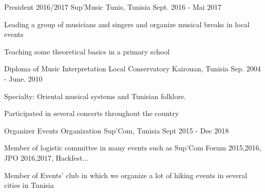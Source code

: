 

\begin{cventries}

  \cventry
    {President 2016/2017} %
    {Sup'Music} %
    {Tunis, Tunisia } %
    {Sept. 2016 - Mai 2017} %
    {
      \begin{cvitems} %
        \item {Leading a group of musicians and singers and organize musical breaks in local events}
        \item {Teaching some theoretical basics in a primary school }
      \end{cvitems}
    }

  \cventry
    {Diploma of Music Interpretation} %
    {Local Conservatory} %
    {Kairouan, Tunisia} %
    {Sep. 2004 - June. 2010} %
    {
      \begin{cvitems} %
        \item {Specialty: Oriental musical systems and Tunisian folklore.}
        \item {Participated in several concerts throughout the country}
      \end{cvitems}
    }

 \cventry
    {Organizer} %
    {Events Organization} %
    {Sup'Com, Tunisia} %
    {Sept 2015 - Dec 2018} %
    {
      \begin{cvitems} %
        \item {Member of logistic committee in many events such as Sup'Com Forum 2015,2016, JPO 2016,2017, Hackfest... }
        \item {Member of Events' club in which we organize a lot of hiking events in several cities in Tunisia}
      \end{cvitems}
    }


\end{cventries}
